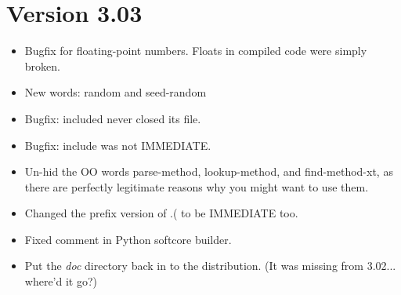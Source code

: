\section*{Version 3.03}
\begin{itemize}[noitemsep]
	\item Bugfix for floating-point numbers. Floats in compiled
	code were simply broken.

	\item New words: random and seed-random

	\item Bugfix: included never closed its file.

	\item Bugfix: include was not IMMEDIATE.

	\item Un-hid the OO words parse-method, lookup-method, and
	find-method-xt, as there are perfectly legitimate reasons why
	you might want to use them.

	\item Changed the prefix version of .( to be IMMEDIATE too.

	\item Fixed comment in Python softcore builder.

	\item Put the \textit{doc} directory back in to the
	distribution. (It was missing from 3.02... where'd it go?)
\end{itemize}


